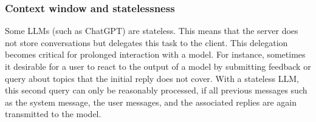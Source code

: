 \subsubsection{Context window and statelessness}

Some \acp{LLM} (such as ChatGPT) are stateless.  This means that the server does not store conversations but delegates this task to the client.  This delegation becomes critical for prolonged interaction with a model. For instance, sometimes it desirable for a user to react to the output of a model by submitting feedback or query about topics that the initial reply does not cover. With a stateless \ac{LLM}, this second query can only be reasonably processed, if all previous messages such as the system message, the user messages, and the associated replies are again transmitted to the model. 


